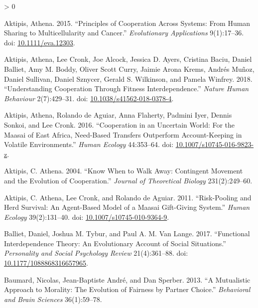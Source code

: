 \documentclass[
]{article}
\newlength{\cslhangindent}
\newenvironment{CSLReferences}[2] %
 {%
  \setlength{\parindent}{0pt}
  \ifodd #1 \everypar{\setlength{\hangindent}{\cslhangindent}}\ignorespaces\fi
  \ifnum #2 > 0
  \setlength{\parskip}{#2\baselineskip}
  \fi
 }%
 {}
\begin{document}
\hypertarget{refs}{}
\begin{CSLReferences}{1}{0}
\leavevmode\hypertarget{ref-aktipisathenaPrinciplesCooperationSystems2015}{}%
Aktipis, Athena. 2015. {``Principles of Cooperation Across Systems: From Human Sharing to Multicellularity and Cancer.''} \emph{Evolutionary Applications} 9(1):17--36. doi: \href{https://doi.org/10.1111/eva.12303}{10.1111/eva.12303}.

\leavevmode\hypertarget{ref-aktipisUnderstandingCooperationFitness2018}{}%
Aktipis, Athena, Lee Cronk, Joe Alcock, Jessica D. Ayers, Cristina Baciu, Daniel Balliet, Amy M. Boddy, Oliver Scott Curry, Jaimie Arona Krems, Andrés Muñoz, Daniel Sullivan, Daniel Sznycer, Gerald S. Wilkinson, and Pamela Winfrey. 2018. {``Understanding Cooperation Through Fitness Interdependence.''} \emph{Nature Human Behaviour} 2(7):429--31. doi: \href{https://doi.org/10.1038/s41562-018-0378-4}{10.1038/s41562-018-0378-4}.

\leavevmode\hypertarget{ref-aktipisCooperationUncertainWorld2016}{}%
Aktipis, Athena, Rolando de Aguiar, Anna Flaherty, Padmini Iyer, Dennis Sonkoi, and Lee Cronk. 2016. {``Cooperation in an {Uncertain World}: {For} the {Maasai} of {East Africa}, {Need}-{Based Transfers Outperform Account}-{Keeping} in {Volatile Environments}.''} \emph{Human Ecology} 44:353--64. doi: \href{https://doi.org/10.1007/s10745-016-9823-z}{10.1007/s10745-016-9823-z}.

\leavevmode\hypertarget{ref-aktipis2004know}{}%
Aktipis, C. Athena. 2004. {``Know When to Walk Away: Contingent Movement and the Evolution of Cooperation.''} \emph{Journal of Theoretical Biology} 231(2):249--60.

\leavevmode\hypertarget{ref-aktipisRiskPoolingHerdSurvival2011}{}%
Aktipis, C. Athena, Lee Cronk, and Rolando de Aguiar. 2011. {``Risk-{Pooling} and {Herd Survival}: {An Agent}-{Based Model} of a {Maasai Gift}-{Giving System}.''} \emph{Human Ecology} 39(2):131--40. doi: \href{https://doi.org/10.1007/s10745-010-9364-9}{10.1007/s10745-010-9364-9}.

\leavevmode\hypertarget{ref-ballietFunctionalInterdependenceTheory2017}{}%
Balliet, Daniel, Joshua M. Tybur, and Paul A. M. Van Lange. 2017. {``Functional {Interdependence Theory}: {An Evolutionary Account} of {Social Situations}.''} \emph{Personality and Social Psychology Review} 21(4):361--88. doi: \href{https://doi.org/10.1177/1088868316657965}{10.1177/1088868316657965}.

\leavevmode\hypertarget{ref-baumard2013mutualistic}{}%
Baumard, Nicolas, Jean-Baptiste André, and Dan Sperber. 2013. {``A Mutualistic Approach to Morality: The Evolution of Fairness by Partner Choice.''} \emph{Behavioral and Brain Sciences} 36(1):59--78.


\end{CSLReferences}
\end{document}
